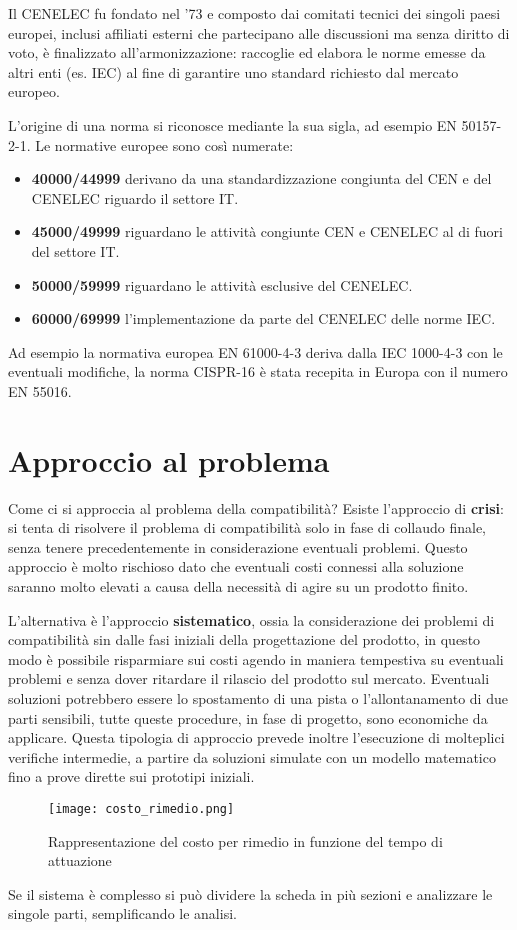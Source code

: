 Il CENELEC fu fondato nel '73 e composto dai comitati tecnici dei singoli paesi europei, inclusi affiliati
esterni che partecipano alle discussioni ma senza diritto di voto, è finalizzato all'armonizzazione: raccoglie 
ed elabora le norme emesse da altri enti (es. IEC) al fine di garantire uno standard richiesto dal mercato
europeo.

L'origine di una norma si riconosce mediante la sua sigla, ad esempio EN 50157-2-1.
\newpage
Le normative europee sono così numerate:
\begin{itemize}
 \item \textbf{40000/44999} derivano da una standardizzazione congiunta del CEN e del CENELEC riguardo
 il settore IT.
 \item \textbf{45000/49999} riguardano le attività congiunte CEN e CENELEC al di fuori del settore IT.
 \item \textbf{50000/59999} riguardano le attività esclusive del CENELEC.
 \item \textbf{60000/69999} l'implementazione da parte del CENELEC delle norme IEC.
\end{itemize}
Ad esempio la normativa europea EN 61000-4-3 deriva dalla IEC 1000-4-3 con le eventuali modifiche, la 
norma CISPR-16 è stata recepita in Europa con il numero EN 55016. 

\section{Approccio al problema}
Come ci si approccia al problema della compatibilità? Esiste l'approccio di \textbf{crisi}: si tenta di risolvere il
problema di compatibilità solo in fase di collaudo finale, senza tenere precedentemente in considerazione
eventuali problemi.
Questo approccio è molto rischioso dato che eventuali costi connessi alla soluzione saranno molto elevati
a causa della necessità di agire su un prodotto finito.

L'alternativa è l'approccio \textbf{sistematico}, ossia la considerazione dei problemi di compatibilità sin dalle fasi iniziali
della progettazione del prodotto, in questo modo è possibile risparmiare sui costi agendo in maniera tempestiva
su eventuali problemi e senza dover ritardare il rilascio del prodotto sul mercato.
Eventuali soluzioni potrebbero essere lo spostamento di una pista o l'allontanamento di due parti sensibili,
tutte queste procedure, in fase di progetto, sono economiche da applicare.
Questa tipologia di approccio prevede inoltre l'esecuzione di molteplici verifiche intermedie, a partire
da soluzioni simulate con un modello matematico fino a prove dirette sui prototipi iniziali.
\begin{figure}[h]
 \texttt{[image: costo\_rimedio.png]}
 \centering
 \caption{Rappresentazione del costo per rimedio in funzione del tempo di attuazione}
 \label{fig:costo_rimedio}
\end{figure}
Se il sistema è complesso si può dividere la scheda in più sezioni e analizzare le singole parti,
semplificando le analisi.

